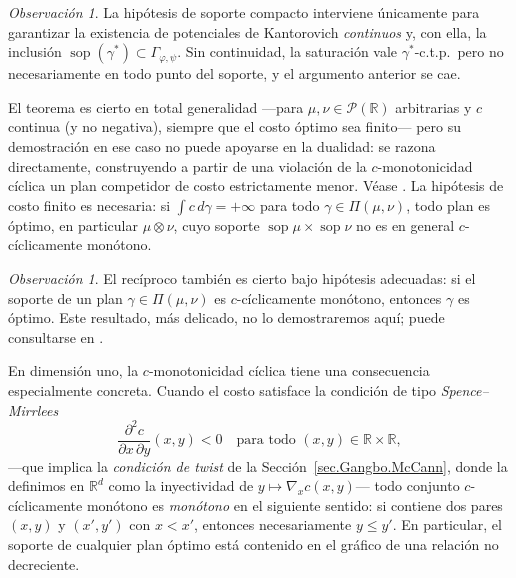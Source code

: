 \documentclass[12pt, a4paper]{amsbook}
\def\sop{\operatorname {\mathrm{sop}}}
\newcommand{\R}{{\mathbb R}}
\theoremstyle{remark}
\newtheorem{obs}[teo]{Observación}
\theoremstyle{definition}
\numberwithin{section}{chapter}
\numberwithin{subsection}{section}
\numberwithin{equation}{section}
\numberwithin{figure}{chapter}
\begin{document}
\begin{obs}
La hipótesis de soporte compacto interviene únicamente para garantizar la existencia
de potenciales de Kantorovich \emph{continuos} y, con ella, la inclusión
$\sop(\gamma^*)\subset\Gamma_{\varphi,\psi}$. Sin continuidad, la saturación vale
$\gamma^*$-c.t.p.\ pero no necesariamente en todo punto del soporte, y el argumento
anterior se cae.

El teorema es cierto en total generalidad —para $\mu,\nu\in\mathcal P(\R)$
arbitrarias y $c$ continua (y no negativa), siempre que el costo óptimo sea
finito— pero su demostración en ese caso no puede apoyarse en la
dualidad: se razona directamente, construyendo a partir de una violación de la
$c$-monotonicidad cíclica un plan competidor de costo estrictamente menor. Véase
\cite[Theorem~1.38]{Santambrogio}. La hipótesis de costo finito es necesaria:
si $\int c\,d\gamma=+\infty$ para todo $\gamma\in\Pi(\mu,\nu)$, todo plan es
óptimo, en particular $\mu\otimes\nu$, cuyo soporte $\sop\mu\times\sop\nu$ no
es en general $c$-cíclicamente monótono.
\end{obs}

\begin{obs}
El recíproco también es cierto bajo hipótesis adecuadas: si el soporte de un plan
$\gamma\in\Pi(\mu,\nu)$ es $c$-cíclicamente monótono, entonces $\gamma$ es óptimo.
Este resultado, más delicado, no lo demostraremos aquí; puede consultarse en
\cite[Theorem~1.38--1.39]{Santambrogio}.
\end{obs}

En dimensión uno, la $c$-monotonicidad cíclica tiene una consecuencia especialmente
concreta. Cuando el costo satisface la condición de tipo
\emph{Spence--Mirrlees}
\[
\frac{\partial^2 c}{\partial x\,\partial y}(x,y)<0
\quad
\text{para todo }(x,y)\in\R\times\R,
\]
—que implica la \emph{condición de twist} de la
Sección~\ref{sec.Gangbo.McCann}, donde la definimos en $\R^d$ como la
inyectividad de $y\mapsto\nabla_xc(x,y)$—
todo conjunto $c$-cíclicamente monótono es \emph{monótono} en el siguiente sentido:
si contiene dos pares $(x,y)$ y $(x',y')$ con $x<x'$, entonces necesariamente
$y\le y'$. En particular, el soporte de cualquier plan óptimo está contenido en el
gráfico de una relación no decreciente.
\end{document}
